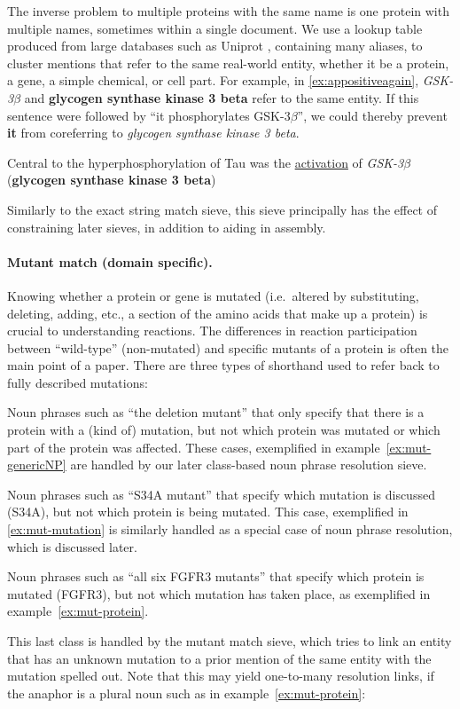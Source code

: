 The inverse problem to multiple proteins with the same name is one protein with multiple names, sometimes within a single document. We use a lookup table 
produced from large databases such as Uniprot \cite{uniprot}, containing many aliases, to cluster mentions that refer to 
the same real-world entity, whether it be a protein, a gene, a simple chemical, or cell part.
For example, in \ref{ex:appositiveagain}, {\it GSK-3$\beta$} and {\bf glycogen synthase kinase 3 beta} refer to the same entity. If this sentence were followed by ``it phosphorylates GSK-3$\beta$'', we could thereby prevent {\bf it} from coreferring to {\it glycogen synthase kinase 3 beta}.

\begin{exe}
	\ex\label{ex:appositiveagain} Central to the hyperphosphorylation of Tau was the \underline{activation} of {\it GSK-3$\beta$} ({\bf glycogen synthase kinase 3 beta})\textellipsis
\end{exe}

Similarly to the exact string match sieve, this sieve principally has the effect of constraining later sieves, in addition to aiding in assembly.

\paragraph{Mutant match (domain specific).} 

Knowing whether a protein or gene is mutated (i.e.\ altered by substituting, deleting, adding, etc., a section of the amino acids that make up a protein) is crucial to understanding reactions. The differences in reaction participation between ``wild-type'' (non-mutated) and specific mutants of a protein is often the main point of a paper. There are three types of shorthand used to refer back to fully described mutations: 
\begin{inlinelist}
\item Noun phrases such as ``the deletion mutant'' that only specify that there is a protein with a (kind of) mutation, but not which protein was mutated or which part of the protein was affected. These cases, exemplified in example~\ref{ex:mut-genericNP} are handled by our later class-based noun phrase resolution sieve.
\item Noun phrases such as ``S34A mutant'' that specify which mutation is discussed (S34A), but not which protein is being mutated. This case, exemplified in \ref{ex:mut-mutation} is similarly handled as a special case of noun phrase resolution, which is discussed later.
\item Noun phrases such as ``all six FGFR3 mutants'' that specify which protein is mutated (FGFR3), but not which mutation has taken place, as exemplified in example~\ref{ex:mut-protein}. 
\end{inlinelist} 
This last class is handled by the mutant match sieve, which tries to link an entity that has an unknown mutation to a prior mention of the same entity with the mutation spelled out.
Note that this may yield one-to-many resolution links, if the anaphor is a plural noun such as in example~\ref{ex:mut-protein}:

